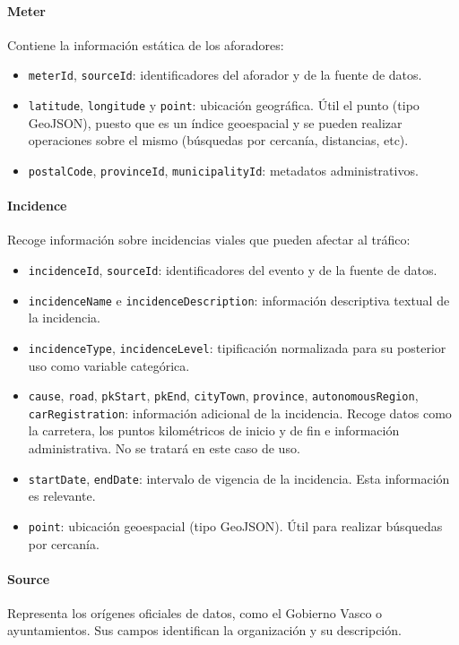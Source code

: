 \paragraph{Meter}
Contiene la información estática de los aforadores:
\begin{itemize}
	\item \texttt{meterId}, \texttt{sourceId}: identificadores del aforador y de la fuente de datos.
	\item \texttt{latitude}, \texttt{longitude} y \texttt{point}: ubicación geográfica. Útil el punto (tipo GeoJSON), puesto que es un índice geoespacial y se pueden realizar operaciones sobre el mismo (búsquedas por cercanía, distancias, etc).
	\item \texttt{postalCode}, \texttt{provinceId}, \texttt{municipalityId}: metadatos administrativos.
\end{itemize}

\paragraph{Incidence}
Recoge información sobre incidencias viales que pueden afectar al tráfico:
\begin{itemize}
	\item \texttt{incidenceId}, \texttt{sourceId}: identificadores del evento y de la fuente de datos.
	\item \texttt{incidenceName} e \texttt{incidenceDescription}: información descriptiva textual de la incidencia.
	\item \texttt{incidenceType}, \texttt{incidenceLevel}: tipificación normalizada para su posterior uso como variable categórica.
	\item \texttt{cause}, \texttt{road}, \texttt{pkStart}, \texttt{pkEnd}, \texttt{cityTown}, \texttt{province}, \texttt{autonomousRegion}, \texttt{carRegistration}: información adicional de la incidencia. Recoge datos como la carretera, los puntos kilométricos de inicio y de fin e información administrativa. No se tratará en este caso de uso.
	\item \texttt{startDate}, \texttt{endDate}: intervalo de vigencia de la incidencia. Esta información es relevante.
	\item \texttt{point}: ubicación geoespacial (tipo GeoJSON). Útil para realizar búsquedas por cercanía.
\end{itemize}

\paragraph{Source}
Representa los orígenes oficiales de datos, como el Gobierno Vasco o ayuntamientos. Sus campos identifican la organización y su descripción.

